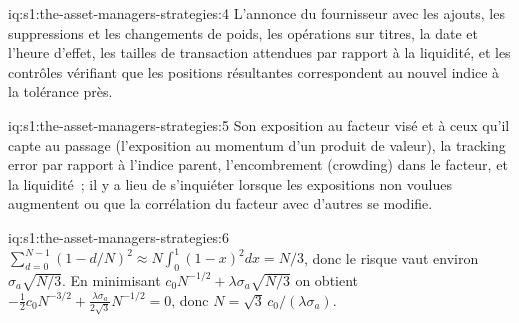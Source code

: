 \begin{solution}{iq:s1:the-asset-managers-strategies:4}
L'annonce du fournisseur avec les ajouts, les suppressions et les changements de poids, les opérations sur titres, la date et l'heure d'effet, les tailles de transaction attendues par rapport à
la liquidité, et les contrôles vérifiant que les positions résultantes correspondent au nouvel indice à la tolérance près.
\end{solution}

\begin{solution}{iq:s1:the-asset-managers-strategies:5}
Son exposition au facteur visé et à ceux qu'il capte au passage (l'exposition au momentum d'un produit de valeur), la tracking error par rapport à l'indice parent, l'encombrement (crowding) dans
le facteur, et la liquidité~; il y a lieu de s'inquiéter lorsque les expositions non voulues augmentent ou que la corrélation du facteur avec d'autres se modifie.
\end{solution}

\begin{solution}{iq:s1:the-asset-managers-strategies:6}
$\sum_{d=0}^{N-1}(1 - d/N)^2 \approx N\int_0^1(1 - x)^2dx = N/3$, donc le risque vaut environ $\sigma_a\sqrt{N/3}$. En minimisant $c_0N^{-1/2} + \lambda\sigma_a
\sqrt{N/3}$ on obtient $-\tfrac12 c_0 N^{-3/2} + \tfrac{\lambda\sigma_a}{2\sqrt3}N^{-1/2} = 0$, donc $N = \sqrt3\,c_0/(\lambda\sigma_a)$.
\end{solution}
